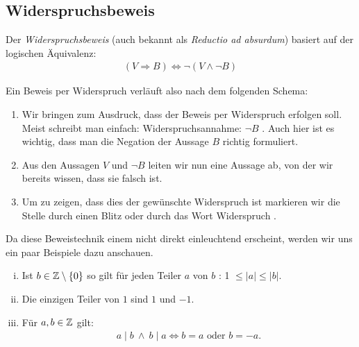 \subsection{Widerspruchsbeweis} %

Der \textit{Widerspruchsbeweis} (auch bekannt als \textit{Reductio ad absurdum}) basiert auf der logischen Äquivalenz: 
\begin{align*}
    (V \Rightarrow B) \iff \neg (V \wedge \neg B)
\end{align*}

Ein Beweis per Widerspruch verläuft also nach dem folgenden Schema: 
\begin{enumerate}
    \item 
    Wir bringen zum Ausdruck, dass der Beweis per Widerspruch erfolgen soll. Meist schreibt man einfach: \glqq Widerspruchsannahme: $\neg B$ \grqq. 
    Auch hier ist es wichtig, dass man die Negation der Aussage $B$ richtig formuliert. 
    \item 
    Aus den Aussagen $V$ und $\neg B$ leiten wir nun eine Aussage ab, von der wir bereits wissen, dass sie falsch ist. 
    \item 
    Um zu zeigen, dass dies der gewünschte Widerspruch ist markieren wir die Stelle durch einen Blitz oder durch das Wort \glqq Widerspruch \grqq. 
\end{enumerate}

Da diese Beweistechnik einem nicht direkt einleuchtend erscheint, werden wir uns ein paar Beispiele dazu anschauen. 

\begin{lemma}
    \begin{enumerate}[(i)]
        \item 
        Ist $b \in \mathbb{Z} \setminus \{0\}$ so gilt für jeden Teiler $a$ von $b$ : 1 $\leq \lvert a \rvert \leq \lvert b \rvert$. 
        \item 
        Die einzigen Teiler von $1$ sind $1$ und $-1$. 
        \item 
        Für $a,b \in \mathbb{Z}$ gilt: 
        \begin{align*}
            a \mid b \ \wedge \ b \mid a \iff b = a \text{  oder } b = -a. 
        \end{align*}
    \end{enumerate}
\end{lemma}

